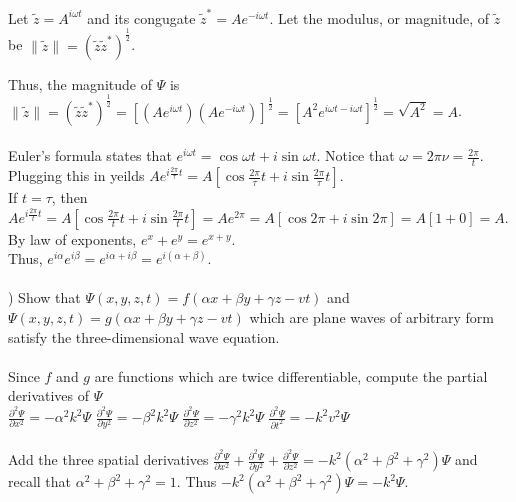 \documentclass[12pt]{article}
\begin{document}
\noindent Let $\tilde{z} = A^{i\omega t}$
\noindent and its congugate $\tilde{z}^{*} = Ae^{-i\omega t}$.
\noindent Let the modulus, or magnitude, of $\tilde{z}$ 
be $\| \tilde{z}\| = (\tilde{z}\tilde{z}^{*})^{\frac{1}{2}}$.

\noindent Thus, the magnitude of $\Psi$ is 
$\| \tilde{z}\| =  (\tilde{z}\tilde{z}^{*})^{\frac{1}{2}} 
= [(Ae^{i\omega t})(Ae^{-i\omega t})]^{\frac{1}{2}}
= [A^{2}e^{i\omega t-i\omega t}]^{\frac{1}{2}}
=\sqrt{A^{2}} = A$.\\\\

\noindent Euler's formula states that $e^{i\omega t} = \cos{\omega t} + i\sin{\omega t}$.
Notice that $\omega = 2\pi\nu = \frac{2\pi}{t}$. Plugging this in yeilds $Ae^{i\frac{2\pi}{\tau}t} = A[\cos{\frac{2\pi}{\tau}t} + i\sin{\frac{2\pi}{\tau}t}]$.\\
If $t = \tau$, then $Ae^{i\frac{2\pi}{t}t} = A[\cos{\frac{2\pi}{t}t} + i\sin{\frac{2\pi}{t}t}]
=Ae^{2\pi} = A[\cos{2\pi} + i\sin{2\pi}] = A[1 + 0] = A$.\\

\noindent By law of exponents, $e^{x} + e^{y} = e^{x+y}$.\\
Thus, $e^{i\alpha}e^{i\beta} = e^{i\alpha + i\beta} = e^{i(\alpha + \beta)}$.\\\\


) Show that $\Psi(x,y,z,t) = f(\alpha x + \beta y + \gamma z - vt)$
and $\Psi(x,y,z,t) = g(\alpha x + \beta y + \gamma z - vt)$ which are plane waves of arbitrary form 
satisfy the three-dimensional wave equation.\\\\

\noindent Since $f$ and $g$ are functions which are twice differentiable, compute the partial 
derivatives of $\Psi$\\

\noindent $\frac{\partial^{2}\Psi}{\partial x^{2}} = -\alpha^{2}k^{2}\Psi$\hspace{50pt}
$\frac{\partial^{2}\Psi}{\partial y^{2}} = -\beta^{2}k^{2}\Psi$\hspace{50pt}
$\frac{\partial^{2}\Psi}{\partial z^{2}} = -\gamma^{2}k^{2}\Psi$\hspace{50pt}
$\frac{\partial^{2}\Psi}{\partial t^{2}} = -k^{2}v^{2}\Psi$\hspace{50pt}\\\\

\noindent Add the three spatial derivatives
$\frac{\partial^{2} \Psi}{\partial x^{2}} + \frac{\partial^{2}\Psi}{\partial y^{2} }
+\frac{\partial ^{2} \Psi}{\partial z^{2}} = -k^{2}(\alpha^{2} + \beta^{2} + \gamma^{2})\Psi$
and recall that $\alpha^{2} + \beta^{2} + \gamma^{2} = 1$. Thus
$-k^{2}(\alpha^{2} + \beta^{2} + \gamma^{2})\Psi = -k^{2}\Psi$.\\\\
\end{document}
